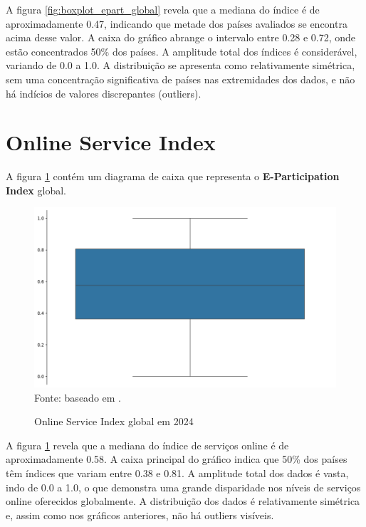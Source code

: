 A figura \ref{fig:boxplot_epart_global} revela que a mediana do índice é de aproximadamente 0.47, indicando que metade dos países avaliados se encontra acima desse valor. A caixa do gráfico abrange o intervalo entre 0.28 e 0.72, onde estão concentrados 50\% dos países. A amplitude total dos índices é considerável, variando de 0.0 a 1.0. A distribuição se apresenta como relativamente simétrica, sem uma concentração significativa de países nas extremidades dos dados, e não há indícios de valores discrepantes (outliers).

\section{Online Service Index}
\label{osi}

A figura \ref{fig:boxplot_osi_global} contém um diagrama de caixa que representa o \textbf{E-Participation Index} global.

\begin{figure}[H]
	\centering
	\caption{Online Service Index global em 2024}
	\includegraphics[width=1\linewidth]{figuras/egdi/boxplot_osi_global.png}
	\label{fig:boxplot_osi_global}
	\footnotesize{Fonte: baseado em \cite{ONU_EGDI_mapa}.}
\end{figure}

A figura \ref{fig:boxplot_osi_global} revela que a mediana do índice de serviços online é de aproximadamente 0.58. A caixa principal do gráfico indica que 50\% dos países têm índices que variam entre 0.38 e 0.81. A amplitude total dos dados é vasta, indo de 0.0 a 1.0, o que demonstra uma grande disparidade nos níveis de serviços online oferecidos globalmente. A distribuição dos dados é relativamente simétrica e, assim como nos gráficos anteriores, não há outliers visíveis.

